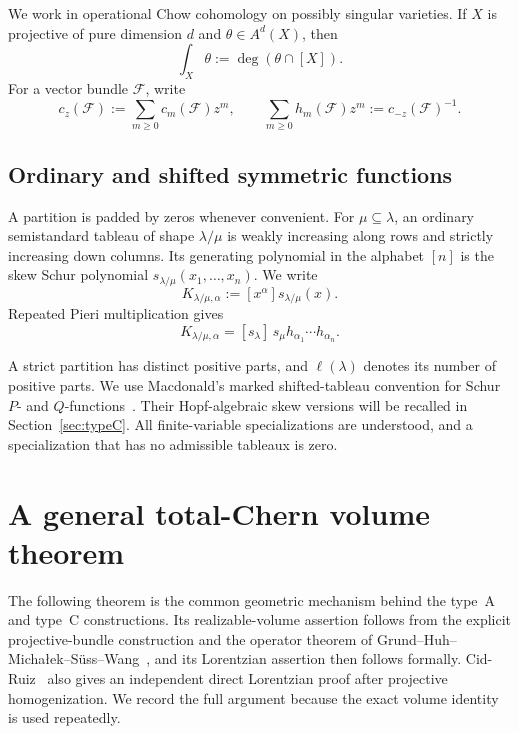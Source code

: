 \documentclass[11pt,a4paper,oneside]{amsart}
\numberwithin{equation}{section}
\theoremstyle{definition}
\theoremstyle{remark}
\newcommand{\cF}{\mathcal F}
\begin{document}
We work in operational Chow cohomology on possibly singular varieties.  If $X$ is projective of pure dimension $d$ and $\theta\in A^d(X)$, then
\[
 \int_X\theta:=\deg(\theta\cap[X]).
\]
For a vector bundle $\cF$, write
\[
 c_z(\cF):=\sum_{m\geq0}c_m(\cF)z^m,
 \qquad
 \sum_{m\geq0}h_m(\cF)z^m:=c_{-z}(\cF)^{-1}.
\]

\subsection{Ordinary and shifted symmetric functions}

A partition is padded by zeros whenever convenient.  For $\mu\subseteq\lambda$, an ordinary semistandard tableau of shape $\lambda/\mu$ is weakly increasing along rows and strictly increasing down columns.  Its generating polynomial in the alphabet $[n]$ is the skew Schur polynomial $s_{\lambda/\mu}(x_1,\ldots,x_n)$.  We write
\begin{equation}\label{eq:ordinary-skew-kostka}
 K_{\lambda/\mu,\alpha}:=[x^\alpha]s_{\lambda/\mu}(x).
\end{equation}
Repeated Pieri multiplication gives
\begin{equation}\label{eq:ordinary-pieri-coeff}
 K_{\lambda/\mu,\alpha}
 =[s_\lambda]\,s_\mu h_{\alpha_1}\cdots h_{\alpha_n}.
\end{equation}

A strict partition has distinct positive parts, and $\ell(\lambda)$ denotes its number of positive parts.  We use Macdonald's marked shifted-tableau convention for Schur $P$- and $Q$-functions~\cite[Chapter~III, Section~8]{Macdonald}.  Their Hopf-algebraic skew versions will be recalled in Section~\ref{sec:typeC}.  All finite-variable specializations are understood, and a specialization that has no admissible tableaux is zero.

\section{A general total-Chern volume theorem}\label{sec:total-chern}

The following theorem is the common geometric mechanism behind the type~A and type~C constructions.  Its realizable-volume assertion follows from the explicit projective-bundle construction and the operator theorem of Grund--Huh--Micha\l ek--S\"uss--Wang~\cite[Theorem~1.3]{GHMSW25}, and its Lorentzian assertion then follows formally.  Cid-Ruiz~\cite[Proposition~6.2]{CidRuiz26} also gives an independent direct Lorentzian proof after projective homogenization.  We record the full argument because the exact volume identity is used repeatedly.
\end{document}
